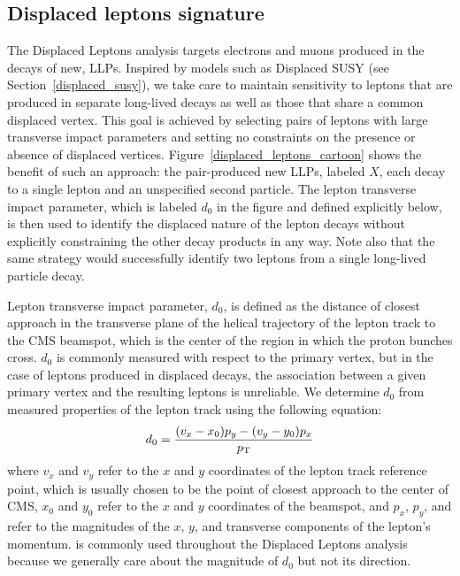 \subsection{Displaced leptons signature}
The Displaced Leptons analysis targets electrons and muons produced in the decays of new, LLPs. Inspired by models such as Displaced SUSY (see Section~\ref{displaced_susy}), we take care to maintain sensitivity to leptons that are produced in separate long-lived decays as well as those that share a common displaced vertex. This goal is achieved by selecting pairs of leptons with large transverse impact parameters and setting no constraints on the presence or absence of displaced vertices. Figure~\ref{displaced_leptons_cartoon} shows the benefit of such an approach: the pair-produced new LLPs, labeled $X$, each decay to a single lepton and an unspecified second particle. The lepton transverse impact parameter, which is labeled $d_0$ in the figure and defined explicitly below, is then used to identify the displaced nature of the lepton decays without explicitly constraining the other decay products in any way. Note also that the same strategy would successfully identify two leptons from a single long-lived particle decay.



Lepton transverse impact parameter, $d_0$, is defined as the distance of closest approach in the transverse plane of the helical trajectory of the lepton track to the CMS beamspot, which is the center of the region in which the proton bunches cross. $d_0$ is commonly measured with respect to the primary vertex, but in the case of leptons produced in displaced decays, the association between a given primary vertex and the resulting leptons is unreliable. We determine $d_0$ from measured properties of the lepton track using the following equation:
\begin{equation}
    d_0 = \frac{(v_x - x_0)p_y - (v_y - y_0)p_x}{p_{\mathrm{T}}}
\end{equation}
where $v_x$ and $v_y$ refer to the $x$ and $y$ coordinates of the lepton track reference point, which is usually chosen to be the point of closest approach to the center of CMS, $x_0$ and $y_0$ refer to the $x$ and $y$ coordinates of the beamspot, and $p_x$, $p_y$, and \pt refer to the magnitudes of the $x$, $y$, and transverse components of the lepton's momentum. \ad is commonly used throughout the Displaced Leptons analysis because we generally care about the magnitude of $d_0$ but not its direction.


